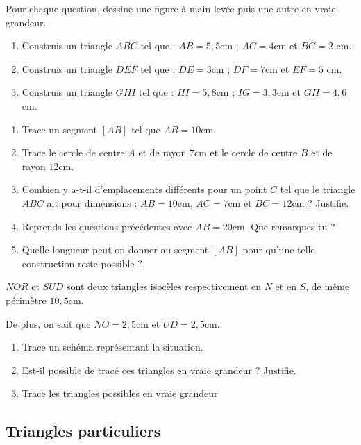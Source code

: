 \documentclass[a4paper,10pt]{report}
\begin{document}
\begin{ex}
Pour chaque question, dessine une figure à main levée puis une autre en vraie grandeur.
\begin{enumerate}[font=\color{exer1}]
\item Construis un triangle $ABC$ tel que : $AB= 5,5$cm ; $AC= 4$cm et $BC=2$ cm.
\item Construis un triangle $DEF$ tel que : $DE= 3$cm ; $DF= 7$cm et $EF= 5$ cm.
\item Construis un triangle $GHI$ tel que : $HI = 5,8$cm ; $IG= 3,3$cm et $GH= 4,6$cm.
\end{enumerate}
\end{ex}

\begin{ex}

\medskip
\begin{enumerate}[font=\color{exer1}]
\item Trace un segment $[AB]$ tel que $AB=10$cm.
\item Trace le cercle de centre $A$ et de rayon $7$cm et le cercle de centre $B$ et de rayon $12$cm.
\item Combien y a-t-il d'emplacements différents pour un point $C$ tel que le triangle $ABC$ ait pour dimensions : $AB= 10$cm, $AC=7$cm et $BC= 12$cm ? Justifie.
\item Reprends les questions précédentes avec $AB=20$cm. Que remarques-tu ?
\item Quelle longueur peut-on donner au segment $[AB]$ pour qu'une telle construction reste possible ?
\end{enumerate}
\end{ex}

\begin{ex}
$NOR$ et $SUD$ sont deux triangles isocèles respectivement en $N$ et en $S$, de même périmètre $10,5$cm.

\noindent De plus, on sait que $NO=2,5$cm et $UD=2,5$cm.

\begin{enumerate}[font=\color{exer2}]
\item Trace un schéma représentant la situation.
\item Est-il possible de tracé ces triangles en vraie grandeur ? Justifie.
\item Trace les triangles possibles en vraie grandeur
\end{enumerate}
\end{ex}

\newpage
\subsection*{Triangles particuliers}
\end{document}
